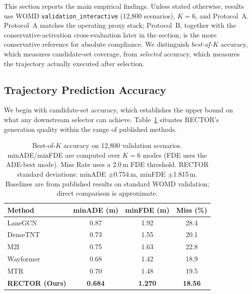 This section reports the main empirical findings. Unless stated otherwise, results use WOMD \texttt{validation\_interactive} (12{,}800 scenarios), $K{=}6$, and Protocol~A. Protocol~A matches the operating proxy stack; Protocol~B, together with the conservative-activation cross-evaluation later in the section, is the more conservative reference for absolute compliance. We distinguish \emph{best-of-$K$} accuracy, which measures candidate-set coverage, from \emph{selected} accuracy, which measures the trajectory actually executed after selection.

\subsection{Trajectory Prediction Accuracy}
\label{subsec:trajectory_accuracy}

We begin with candidate-set accuracy, which establishes the upper bound on what any downstream selector can achieve. Table~\ref{tab:main_results} situates RECTOR's generation quality within the range of published methods.

\begin{table}[t]
\centering
\caption{Candidate-Set Accuracy Context on WOMD \texttt{validation\_interactive}}
\label{tab:main_results}
\begin{tabular}{lccc}
\toprule
\textbf{Method} & \textbf{minADE (m)} \color{green}{$\downarrow$} & \textbf{minFDE (m)} \color{green}{$\downarrow$} & \textbf{Miss (\%)} \color{green}{$\downarrow$} \\
\midrule
LaneGCN & 0.87 & 1.92 & 28.4 \\
DenseTNT & 0.73 & 1.55 & 20.1 \\
M2I & 0.75 & 1.63 & 22.8 \\
Wayformer & 0.68 & 1.42 & 18.9 \\
MTR & 0.70 & 1.48 & 19.5 \\
\midrule
\textbf{RECTOR (Ours)} & \textbf{0.684} & \textbf{1.270} & \textbf{18.56} \\
\bottomrule
\end{tabular}
\vspace{1mm}
\caption*{\footnotesize Best-of-$K$ accuracy on 12{,}800 validation scenarios.  minADE/minFDE are computed over $K{=}6$ modes (FDE uses the ADE-best mode).  Miss Rate uses a 2.0\,m FDE threshold.  RECTOR standard deviations: minADE $\pm$0.754\,m, minFDE $\pm$1.815\,m.  Baselines are from published results on standard WOMD validation; direct comparison is approximate.}
\end{table}

